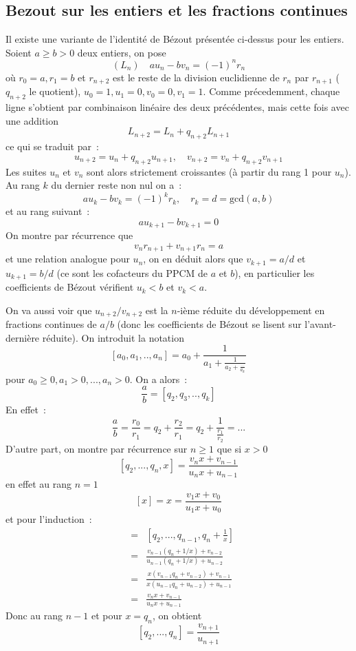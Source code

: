 \documentclass[a4paper,11pt]{book}
\begin{document}
\begin{giacjshere}
\subsection{Bezout sur les entiers et les fractions continues}
Il existe une variante de l'identit\'e de B\'ezout pr\'esent\'ee
ci-dessus pour les entiers. Soient $a\geq b>0$ deux entiers, on pose
$$ (L_n) \quad a u_n - b v_n = (-1)^n r_n $$ 
o\`u $r_0=a, r_1=b$ et $r_{n+2}$ est le reste de la division
euclidienne de $r_n$ par $r_{n+1}$ ($q_{n+2}$ le quotient), $u_0=1, u_1=0, v_0=0,v_1=1$.
Comme pr\'ecedemment, chaque ligne s'obtient par combinaison
lin\'eaire des deux pr\'ec\'edentes, mais cette fois avec une addition
$$ L_{n+2}=L_n+q_{n+2} L_{n+1}$$ 
ce qui se traduit par~:
$$ u_{n+2}=u_n+q_{n+2} u_{n+1}, \quad v_{n+2}=v_n+q_{n+2} v_{n+1}$$
Les suites $u_n$ et $v_n$ sont alors strictement croissantes (\`a
partir du rang 1 pour $u_n$). Au rang $k$ du dernier reste non nul on
a~:
$$ a u_k - b v_k = (-1)^k r_k, \quad r_k=d=\mbox{gcd}(a,b)$$
et au rang suivant~:
$$ au_{k+1} -b v_{k+1}=0$$
On montre par r\'ecurrence que
$$ v_n r_{n+1} + v_{n+1} r_n=a$$
et une relation analogue pour $u_n$, on en d\'eduit alors que
$v_{k+1}=a/d$ et $u_{k+1}=b/d$ (ce sont les cofacteurs du PPCM de $a$
et $b$), 
en particulier les coefficients de
B\'ezout v\'erifient $u_k<b$ et $v_k<a$.

On va aussi voir que $u_{n+2}/v_{n+2}$ est la $n$-i\`eme r\'eduite du
d\'eveloppement
en fractions continues de $a/b$ (donc les coefficients de B\'ezout
se lisent sur l'avant-derni\`ere r\'eduite). On introduit la notation
$$[a_0,a_1,..,a_n] =a_0+\frac{1}{a_1+\frac{1}{a_2+\frac{...}{a_k}}}$$
pour $a_0 \geq 0, a_1>0, ..., a_n>0$.
On a alors~:
$$ \frac{a}{b}=[q_2,q_3,..,q_k]$$
En effet~:
$$ \frac{a}{b}= \frac{r_0}{r_1}=q_2 +\frac{r_2}{r_1} = q_2 +
\frac{1}{\frac{r_1}{r_2}} = ...$$
D'autre part, on montre par r\'ecurrence sur $n\geq 1$ que si $x>0$
$$ [q_2,..., q_n,x]=\frac{v_{n}x+v_{n-1}}{u_{n}x+u_{n-1}}$$
en effet au rang $n=1$
$$ [x]=x=\frac{v_1 x + v_0}{u_1 x+u_0 }$$
et pour l'induction~:
\begin{eqnarray*}
  [q_2,..., q_n,x] &= & [q_2,..., q_{n-1},q_n+\frac{1}{x}] \\
&=& \frac{v_{n-1}(q_n+1/x)+v_{n-2}}{u_{n-1}(q_n+1/x)+u_{n-2}} \\
&=&
\frac{x(v_{n-1}q_n+v_{n-2})+v_{n-1}}{x(u_{n-1}q_n+u_{n-2})+u_{n-1}} \\
& = & 
\frac{v_{n}x+v_{n-1}}{u_{n}x+u_{n-1}}
\end{eqnarray*}
Donc au rang $n-1$ et pour $x=q_{n}$, on obtient 
$$ [q_2,..., q_n]=\frac{v_{n+1}}{u_{n+1}}$$


\end{giacjshere}
\end{document}
